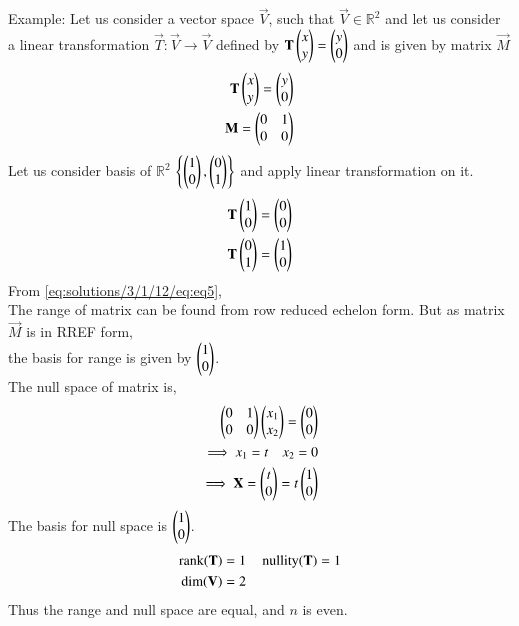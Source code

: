 Example: Let us consider a vector space $\vec{V}$, such that $\vec{V} \in \mathbb{R}^2$ and let us consider a linear transformation $\vec{T} : \vec{V} \xrightarrow{}  \vec{V}$ defined by $\mathbf{T}\begin{pmatrix}x\\y\end{pmatrix} = \begin{pmatrix}y\\0\end{pmatrix}$ and is given by matrix $\vec{M}$\\
\begin{align}
    \mathbf{T}\begin{pmatrix}x\\y\end{pmatrix} = \begin{pmatrix}y\\0\end{pmatrix}\\
    \mathbf{M} = \begin{pmatrix}0&1\\0&0\end{pmatrix} \label{eq:solutions/3/1/12/eq:eq5}
\end{align}
Let us consider basis of $\mathbb{R}^2$ $\left\{\begin{pmatrix}1\\0\end{pmatrix}, \begin{pmatrix}0\\1\end{pmatrix}\right\}$ and apply linear transformation on it.
\begin{align}
    \mathbf{T}\begin{pmatrix}1\\0\end{pmatrix} = \begin{pmatrix}0\\0\end{pmatrix}\\
    \mathbf{T}\begin{pmatrix}0\\1\end{pmatrix} = \begin{pmatrix}1\\0\end{pmatrix}
\end{align}
From \eqref{eq:solutions/3/1/12/eq:eq5},\\
The range of matrix can be found from row reduced echelon form. But as matrix $\vec{M}$ is in RREF form,\\
the basis for range is given by $\begin{pmatrix}1\\0\end{pmatrix}$.\\
The null space of matrix is,
\begin{align}
    \begin{pmatrix}0&1\\0&0\end{pmatrix}\begin{pmatrix}x_1\\x_2\end{pmatrix} = \begin{pmatrix}0\\0\end{pmatrix}\\
\implies x_1 = t \quad x_2 = 0\\
\implies \mathbf{X} = \begin{pmatrix}t\\0\end{pmatrix} = t\begin{pmatrix}1\\0\end{pmatrix}
\end{align}
The basis for null space is $\begin{pmatrix}1\\0\end{pmatrix}$.
\begin{align}
    \operatorname*{rank}(\mathbf{T}) &= 1 \quad \operatorname*{nullity}(\mathbf{T}) = 1 \label{eq:solutions/3/1/12/eq:eq6}\\
    \dim(\mathbf{V}) &= 2 \label{eq:solutions/3/1/12/eq:eq7}
\end{align}
Thus the range and null space are equal, and $n$ is even. 
